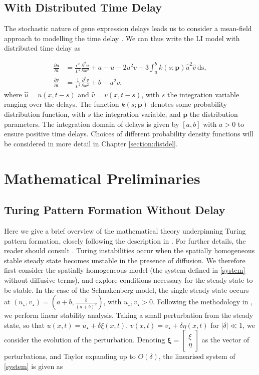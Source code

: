 \subsection{With Distributed Time Delay}

The stochastic nature of gene expression delays leads us to consider a mean-field approach to modelling the time delay \cite{bratsun,krausenew}. We can thus write the LI model with distributed time delay as

\begin{equation}\label{distmodel}
  \begin{split}
    \frac{\partial u}{\partial t}&=\frac{\epsilon^2}{L^2}\frac{\partial^2u}{\partial x^2}+a-u-2u^2v+3\int_{a}^{b}k(s;\textbf{p})\hat{u}^2\hat{v} \ \text{ds},\\
    \frac{\partial v}{\partial t}&=\frac{1}{L^2}\frac{\partial^2v}{\partial x^2}+b-u^2v,
\end{split}
\end{equation}
where $\hat{u}=u(x,t-s)$ and $\hat{v}=v(x,t-s)$, with $s$ the integration variable ranging over the delays. The function $k(s;\textbf{p})$ denotes some probability distribution function, with $s$ the integration variable, and $\textbf{p}$ the distribution parameters. The integration domain of delays is given by $[a,b]$ with $a>0$ to ensure positive time delays. Choices of different probability density functions will be considered in more detail in Chapter \ref{section:distdel}.

\section{Mathematical Preliminaries}
\subsection{Turing Pattern Formation Without Delay}
Here we give a brief overview of the mathematical theory underpinning Turing pattern formation, closely following the description in \cite{murray}. For further details, the reader should consult \cite{murray,beentjes}. Turing instabilities occur when the spatially homogeneous stable steady state becomes unstable in the presence of diffusion. We therefore first consider the spatially homogeneous model (the system defined in \eqref{system} without diffusive terms), and explore conditions necessary for the steady state to be stable. In the case of the Schnakenberg model, the single steady state occurs at $(u_\star, v_\star)=\left(a+b, \frac{b}{(a+b)^2}\right)$, with $u_\star,v_\star>0$. Following the methodology in \cite{murray}, we perform linear stability analysis. Taking a small perturbation from the steady state, so that $u(x,t)=u_\star+\delta\xi(x,t) $, $v(x,t)=v_\star+\delta\eta(x,t) $ for $|\delta|\ll1$, we consider the evolution of the perturbation. Denoting $\pmb{\xi}=\begin{bmatrix}\xi \\ \eta\end{bmatrix}$ as the vector of perturbations, and Taylor expanding up to $O(\delta)$, the linearised system of \eqref{system} is given as

